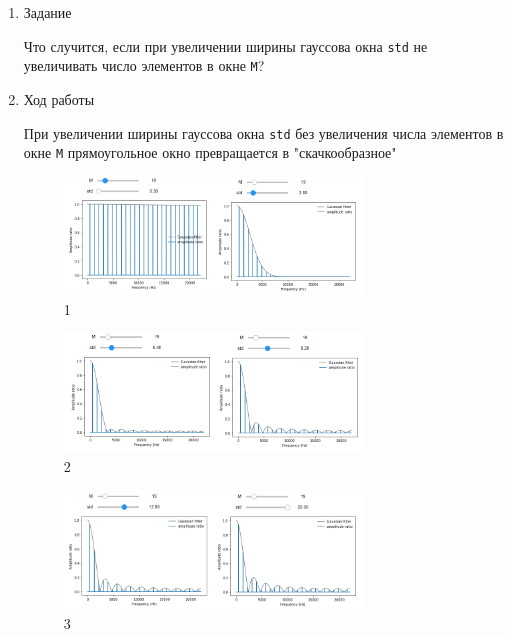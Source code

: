 \documentclass[a4paper,12pt]{article}
\begin{document}
	\begin{enumerate}
		
		\item{Задание}
		
		Что случится, если при увеличении ширины гауссова окна \texttt{std} не увеличивать число элементов в окне \texttt{M}?
		
		\item{Ход работы}
		
		При увеличении ширины гауссова окна \texttt{std} без увеличения числа элементов в окне \texttt{M} прямоугольное окно превращается в "скачкообразное"
		
		\begin{figure}[H]
			\centering
			\includegraphics[width=0.75\textwidth]{1_1.png}
			\caption{1}
			\label{fig:1.1}
		\end{figure}
		\begin{figure}[H]
			\centering
			\includegraphics[width=0.75\textwidth]{1_2.png}
			\caption{2}
			\label{fig:1.2}
		\end{figure}
		\begin{figure}[H]
			\centering
			\includegraphics[width=0.75\textwidth]{1_3.png}
			\caption{3}
			\label{fig:1.3}
		\end{figure}
		
	\end{enumerate}
\end{document}
